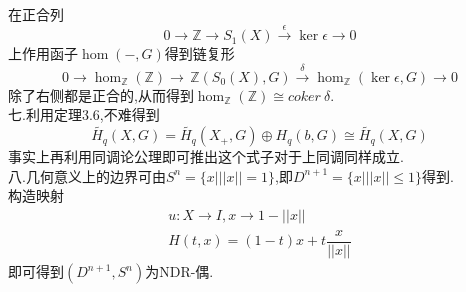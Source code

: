 \documentclass[a4paper]{ctexart}
\newcommand{\ess}[5]{0\xrightarrow{}#1\xrightarrow{#2}#3\xrightarrow{#4}#5\xrightarrow{}0}
\begin{document}
在正合列
\[\ess{\mathbb{Z}}{}{S_1(X)}{\epsilon}{\ker \epsilon}\]
上作用函子$\hom(-,G)$得到链复形
\[\ess{\hom_{\mathbb{Z}}(\mathbb{Z})}{}{\,{\mathbb{Z}}(S_0(X),G)}{\delta}{\hom_{\mathbb{Z}}(\ker \epsilon,G)}\]
除了右侧都是正合的,从而得到$\hom_{\mathbb{Z}}(\mathbb{Z})\cong coker ~\delta$.\\
七.利用定理3.6,不难得到
\[\tilde{H_q}(X,G)=\tilde{H_q}(X_+,G)\oplus H_q(b,G)\cong \tilde{H_q}(X,G)\]
事实上再利用同调论公理即可推出这个式子对于上同调同样成立.\\
八.几何意义上的边界可由$S^n=\{x|||x||=1\}$,即$D^{n+1}=\{x|||x||\leq 1\}$得到.\\
构造映射
\[\begin{array}{l}
u:X\to I ,x \to 1-||x||\\
H(t,x)=(1-t)x+t\dfrac{x}{||x||}
\end{array}\]
即可得到$(D^{n+1},S^n)$为NDR-偶.
\end{document}
